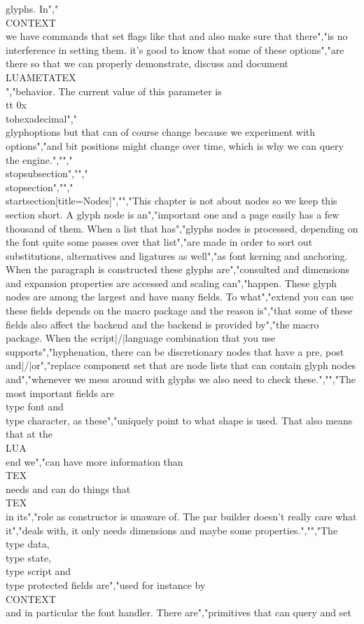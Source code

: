 glyphs. In","\\CONTEXT\\ we have commands that set flags like that and also make sure that there","is no interference in setting them. it's good to know that some of these options","are there so that we can properly demonstrate, discuss and document \\LUAMETATEX\\","behavior. The current value of this parameter is {\\tt 0x\\tohexadecimal","\\glyphoptions} but that can of course change because we experiment with options","and bit positions might change over time, which is why we can query the engine.","","\\stopsubsection","","\\stopsection","","\\startsection[title={Nodes}]","","This chapter is not about nodes so we keep this section short. A glyph node is an","important one and a page easily has a few thousand of them. When a list that has","glyphs nodes is processed, depending on the font quite some passes over that list","are made in order to sort out substitutions, alternatives and ligatures as well","as font kerning and anchoring. When the paragraph is constructed these glyphs are","consulted and dimensions and expansion properties are accessed and scaling can","happen. These glyph nodes are among the largest and have many fields. To what","extend you can use these fields depends on the macro package and the reason is","that some of these fields also affect the backend and the backend is provided by","the macro package. When the script|/|language combination that you use supports","hyphenation, there can be discretionary nodes that have a pre, post and|/|or","replace component set that are node lists that can contain glyph nodes and","whenever we mess around with glyphs we also need to check these.","","The most important fields are \\type {font} and \\type {character}, as these","uniquely point to what shape is used. That also means that at the \\LUA\\ end we","can have more information than \\TEX\\ needs and can do things that \\TEX\\ in its","role as constructor is unaware of. The par builder doesn't really care what it","deals with, it only needs dimensions and maybe some properties.","","The \\type {data}, \\type {state}, \\type {script} and \\type {protected} fields are","used for instance by \\CONTEXT\\ and in particular the font handler. There are","primitives that can query and set 